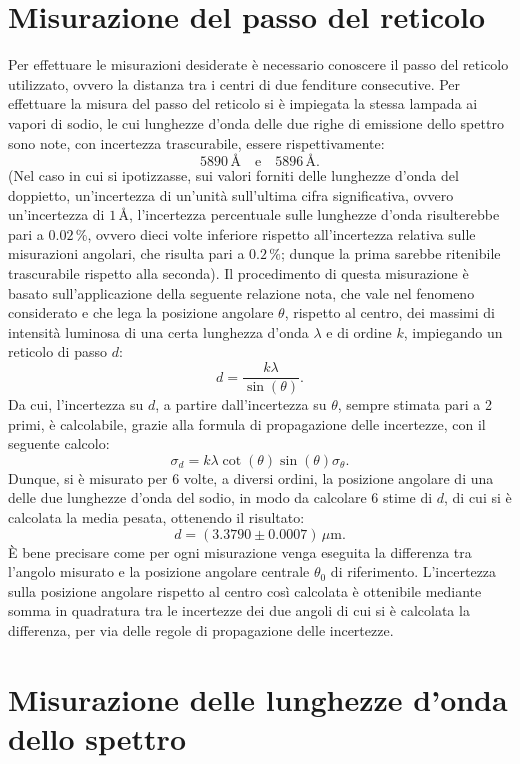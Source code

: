\documentclass[a4paper,12pt]{article}
\begin{document}
\section{Misurazione del passo del reticolo}
Per effettuare le misurazioni desiderate è necessario conoscere il passo del reticolo utilizzato, ovvero la distanza tra i centri di due fenditure consecutive.
Per effettuare la misura del passo del reticolo si è impiegata la stessa lampada ai vapori di sodio, le cui lunghezze d’onda delle due righe di emissione dello spettro sono note, con incertezza trascurabile, essere rispettivamente:
\[
5890 \, \text{\AA} \quad \text{e} \quad 5896 \, \text{\AA}.
\]
(Nel caso in cui si ipotizzasse, sui valori forniti delle lunghezze d’onda del doppietto, un’incertezza di un’unità sull’ultima cifra significativa, ovvero un’incertezza di \( 1 \, \text{\AA} \), l’incertezza percentuale sulle lunghezze d’onda risulterebbe pari a \( 0.02 \, \% \), ovvero dieci volte inferiore rispetto all’incertezza relativa sulle misurazioni angolari, che risulta pari a \( 0.2 \, \% \); dunque la prima sarebbe ritenibile trascurabile rispetto alla seconda). 
Il procedimento di questa misurazione è basato sull’applicazione della seguente relazione nota, che vale nel fenomeno considerato e che lega la posizione angolare \( \theta \), rispetto al centro, dei massimi di intensità luminosa di una certa lunghezza d’onda \( \lambda \) e di ordine \( k \), impiegando un reticolo di passo \( d \):
\[
d = \frac{k\lambda}{\sin(\theta)}.
\]
Da cui, l’incertezza su \( d \), a partire dall’incertezza su \( \theta \), sempre stimata pari a 2 primi, è calcolabile, grazie alla formula di propagazione delle incertezze, con il seguente calcolo:
\[
\sigma_d = k\lambda \cot(\theta) \sin(\theta) \sigma_\theta.
\]
Dunque, si è misurato per 6 volte, a diversi ordini, la posizione angolare di una delle due lunghezze d’onda del sodio, in modo da calcolare 6 stime di \( d \), di cui si è calcolata la media pesata, ottenendo il risultato:
\[
d = (3.3790 \pm 0.0007) \, \mu\text{m}.
\]
È bene precisare come per ogni misurazione venga eseguita la differenza tra l’angolo misurato e la posizione angolare centrale \( \theta_0 \) di riferimento. L’incertezza sulla posizione angolare rispetto al centro così calcolata è ottenibile mediante somma in quadratura tra le incertezze dei due angoli di cui si è calcolata la differenza, per via delle regole di propagazione delle incertezze.


\section{Misurazione delle lunghezze d’onda dello spettro}
\end{document}
